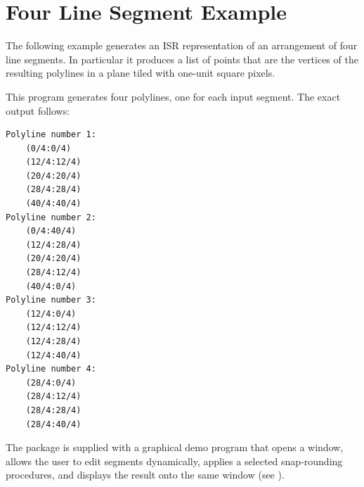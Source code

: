 \section{Four Line Segment Example}

The following example generates an ISR representation
of an arrangement of four line segments. In particular it produces
a list of points that are the vertices of the resulting polylines in a plane
tiled with one-unit square pixels.


This program generates four polylines, one for each input segment. The exact
output follows:

\begin{verbatim}
Polyline number 1:
    (0/4:0/4)
    (12/4:12/4)
    (20/4:20/4)
    (28/4:28/4)
    (40/4:40/4)
Polyline number 2:
    (0/4:40/4)
    (12/4:28/4)
    (20/4:20/4)
    (28/4:12/4)
    (40/4:0/4)
Polyline number 3:
    (12/4:0/4)
    (12/4:12/4)
    (12/4:28/4)
    (12/4:40/4)
Polyline number 4:
    (28/4:0/4)
    (28/4:12/4)
    (28/4:28/4)
    (28/4:40/4)
\end{verbatim}

The package is supplied with a graphical demo program that opens a window,
allows the user to edit segments dynamically, applies a selected
snap-rounding procedures, and displays the result onto the same window
(see ).

